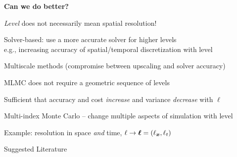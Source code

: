 \begin{frame}{\name{}}

    \textbf{Can we do better?}\vskip2mm
    \begin{squarelist}
        \item<2-> \emph{Level} does not necessarily mean spatial resolution!
        \begin{circlelist}
            \item<3-> Solver-based: use a more accurate solver for higher levels\\
            e.g., increasing accuracy of spatial/temporal discretization with level
            \item<4-> Multiscale methods (compromise between upscaling and solver accuracy)
        \end{circlelist}
        \item<5-> MLMC does not require a geometric sequence of levels 
        \begin{circlelist}
            \item Sufficient that accuracy and cost \emph{increase} and variance \emph{decrease} with $\ell$
        \end{circlelist}
        \item<6-> Multi-index Monte Carlo -- change multiple aspects of simulation with
        level
        \begin{circlelist}
            \item Example: resolution in space \emph{and} time, $\ell \rightarrow \bm{\ell} = (\ell_{\bm{x}}, \ell_t)$
        \end{circlelist}
    \end{squarelist}
    
\end{frame}

\def\name{Suggested Literature}

\begin{frame}{\name{}}
	\begin{scriptsize}
    	
	\end{scriptsize}
\end{frame}